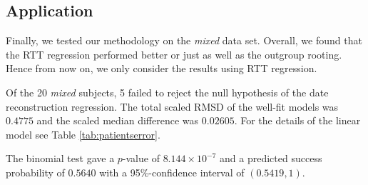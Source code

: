 \documentclass[12pt]{article}
\begin{document}
\subsection * {Application} \label{sec:mixed_data}




Finally, we tested our methodology on the {\em mixed} data set.
Overall, we found that the RTT regression performed better or just as well as the outgroup rooting.
Hence from now on, we only consider the results using RTT regression.

Of the 20 \emph{mixed} subjects, 5 failed to reject the null hypothesis of the date reconstruction regression.
The total scaled RMSD of the well-fit models was $0.4775$ and the scaled median difference was $0.02605$.
For the details of the linear model see Table \ref{tab:patientserror}.

The {binomial test} gave a $p$-value of $8.144 \times 10^{-7}$ and a predicted success probability of $0.5640$ with a 95\%-confidence interval of $(0.5419, 1)$.


\end{document}
